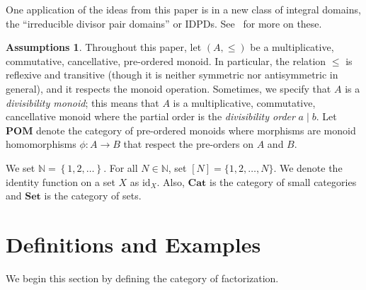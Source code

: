 \documentclass[reqno]{amsart}
\theoremstyle{plain}
\theoremstyle{definition}
\newtheorem*{assumptions}{Assumptions}
\newcommand{\bbn}{\mathbb{N}}
\renewcommand{\leq}{\leqslant}
\newcommand{\catset}{\mathbf{Set}}
\newcommand{\catcat}{\mathbf{Cat}}
\newcommand{\catpom}{\mathbf{POM}}
\numberwithin{equation}{lem}
\begin{document}
One application of the ideas from this paper is  in a new class of 
integral domains, the ``irreducible divisor pair domains'' or IDPDs.
See~\cite{sather:idpd} for more on these.

\begin{assumptions}
Throughout this paper, let $(A,\leq)$ be a multiplicative, commutative, cancellative, pre-ordered monoid. 
In particular, the relation $\leq$  is reflexive and transitive
(though it is neither symmetric nor antisymmetric in general), and it respects the monoid operation.
Sometimes, we specify that $A$ is a \emph{divisibility monoid}; this means that 
$A$ is a multiplicative, commutative, cancellative monoid where
the partial order is the \emph{divisibility order} 
$a\mid b$.
Let  $\catpom$ denote the category of pre-ordered monoids where morphisms are 
monoid homomorphisms $\phi\colon A\to B$ that respect the pre-orders on $A$ and $B$.

We set $\bbn = \left\{1,2,\ldots\right\}$. 
For all $N\in\bbn$, set $[N]=\{1,2,\ldots,N\}$.
We denote the identity function on a set $X$ as $\text{id}_X$.  
Also, $\catcat$ is the category of small categories and $\catset$ is the category of sets.
\end{assumptions}


\section{Definitions and Examples}\label{sec-def}

We begin this section by defining
the category of factorization. 
\end{document}
